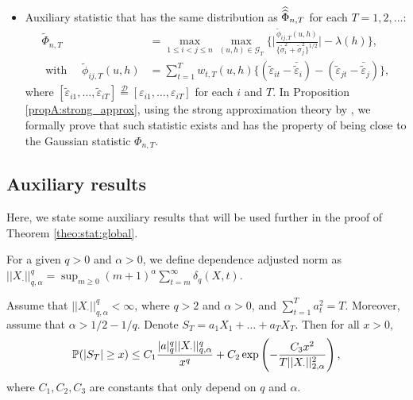 \begin{itemize}
\item Auxiliary statistic that has the same distribution as $\widehat{\widehat{\Phi}}_{n, T}$ for each $T = 1, 2, \ldots$: 
\begin{align*}
\widetilde{\Phi}_{n,T} &= \max_{1 \le i < j \le n}  \max_{(u,h) \in \mathcal{G}_T} \Bigg\{ \bigg|\frac{\widetilde{\phi}_{ij, T}(u,h)}{\{\widetilde{\sigma}_i^2 + \widetilde{\sigma}_j^2 \}^{1/2}} \bigg| - \lambda(h)\Bigg\}, \\
   \text{ with  } \quad  \widetilde{\phi}_{ij, T}(u,h) &= \sum\nolimits_{t=1}^T w_{t,T}(u,h) \big\{ (\widetilde{\varepsilon}_{it} - \bar{\widetilde{\varepsilon}}_i)  - (\widetilde{\varepsilon}_{jt} - \bar{\widetilde{\varepsilon}}_j)\big\},
  \end{align*}
where $[\widetilde{\varepsilon}_{i1},\ldots,\widetilde{\varepsilon}_{iT}] \stackrel{\mathcal{D}}{=} [\varepsilon_{i1},\ldots,\varepsilon_{iT}]$ for each $i$ and $T$. In Proposition \ref{propA:strong_approx}, using the strong approximation theory by \cite{BerkesLiuWu2014}, we formally prove that such statistic exists and has the property of being close to the Gaussian statistic $\Phi_{n,T}$.

\end{itemize}

\subsection{Auxiliary results}\label{subsec:appendix:aux}

Here, we state some auxiliary results that will be used further in the proof of Theorem \ref{theo:stat:global}.

\begin{definitionA}\label{defA-DAN} For a given $q > 0$ and $\alpha > 0$, we define dependence adjusted norm as 
$||X_{\cdot}||^{q}_{q, \alpha} = \sup_{m\geq 0} (m+1)^{\alpha} \sum_{t=m}^{\infty} \delta_{q}(X, t)$.
\end{definitionA}

\begin{theoremA}{\cite{Wu2016}}\label{theo-wu}
Assume that $||X_{\cdot}||^{q}_{q, \alpha} < \infty$, where $q > 2$ and $\alpha >0$, and $\sum_{t=1}^T a_t^2 = T.$ Moreover, assume that $\alpha > 1/2 - 1/q$. Denote \linebreak $S_T = a_1 X_1 + \ldots + a_T X_T$. Then for all $x>0$,
\begin{align*}
	\mathbb{P}(|S_T| \geq x) \leq C_1 \frac{|a|_{q}^{q}||X_{\cdot}||^{q}_{q, \alpha}  }{x^{q}} + C_2 \exp \left( - \frac{C_3 x^2} {T ||X_\cdot||^2_{2, \alpha}}\right),
\end{align*}
where $C_1, C_2, C_3$ are constants that only depend on $q$ and $\alpha$.
\end{theoremA}

